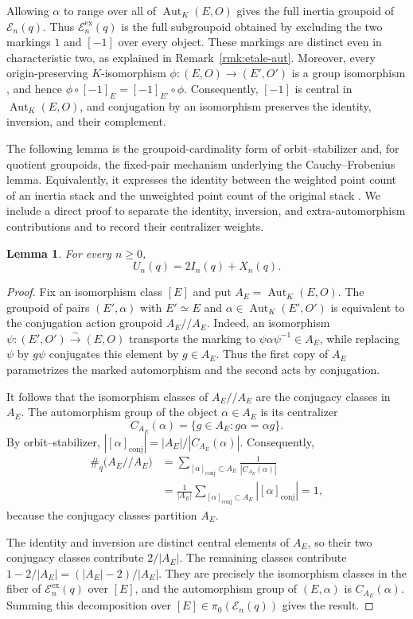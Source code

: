 \documentclass[a4paper,12pt]{amsart}
\newtheorem{lem}[thm]{Lemma}
\theoremstyle{definition}
\newcommand{\cE}{\mathcal E}
\newcommand{\Aut}{\operatorname{Aut}}
\begin{document}
Allowing $\alpha$ to range over all of $\Aut_K(E,O)$ gives the full inertia groupoid of $\cE_n(q)$.  Thus $\cE_n^{\mathrm{ex}}(q)$ is the full subgroupoid obtained by excluding the two markings $1$ and $[-1]$ over every object.  These markings are distinct even in characteristic two, as explained in Remark~\ref{rmk:etale-aut}.  Moreover, every origin-preserving $K$-isomorphism $\phi\colon(E,O)\to(E',O')$ is a group isomorphism \cite[Chapter~III, Theorem~4.8]{Silverman}, and hence $\phi\circ[-1]_E=[-1]_{E'}\circ\phi$.  Consequently, $[-1]$ is central in $\Aut_K(E,O)$, and conjugation by an isomorphism preserves the identity, inversion, and their complement.

The following lemma is the groupoid-cardinality form of orbit--stabilizer and, for quotient groupoids, the fixed-pair mechanism underlying the Cauchy--Frobenius lemma.  Equivalently, it expresses the identity between the weighted point count of an inertia stack and the unweighted point count of the original stack \cite[Theorem~1.1]{HP2}.  We include a direct proof to separate the identity, inversion, and extra-automorphism contributions and to record their centralizer weights.

\begin{lem}\label{lem:inertia}
For every $n\geq0$,
\[
U_n(q)=2I_n(q)+X_n(q).
\]
\end{lem}

\begin{proof}
Fix an isomorphism class $[E]$ and put $A_E=\Aut_K(E,O)$.  The groupoid of pairs $(E',\alpha)$ with $E'\simeq E$ and $\alpha\in\Aut_K(E',O')$ is equivalent to the conjugation action groupoid $A_E\mathbin{//}A_E$.  Indeed, an isomorphism $\psi\colon(E',O')\xrightarrow{\sim}(E,O)$ transports the marking to $\psi\alpha\psi^{-1}\in A_E$, while replacing $\psi$ by $g\psi$ conjugates this element by $g\in A_E$.  Thus the first copy of $A_E$ parametrizes the marked automorphism and the second acts by conjugation.

It follows that the isomorphism classes of $A_E\mathbin{//}A_E$ are the conjugacy classes in $A_E$.  The automorphism group of the object $\alpha\in A_E$ is its centralizer
\[
C_{A_E}(\alpha)=\{g\in A_E:g\alpha=\alpha g\}.
\]
By orbit--stabilizer,
$|[\alpha]_{\mathrm{conj}}|=|A_E|/|C_{A_E}(\alpha)|$.  Consequently,
\[
\begin{aligned}
\#_q\bigl(A_E\mathbin{//}A_E\bigr)
&=
\sum_{[\alpha]_{\mathrm{conj}}\subset A_E}
\frac{1}{|C_{A_E}(\alpha)|}\\
&=
\frac{1}{|A_E|}
\sum_{[\alpha]_{\mathrm{conj}}\subset A_E}
|[\alpha]_{\mathrm{conj}}|
=1,
\end{aligned}
\]
because the conjugacy classes partition $A_E$.

The identity and inversion are distinct central elements of $A_E$, so their two conjugacy classes contribute $2/|A_E|$.  The remaining classes contribute $1-2/|A_E|=(|A_E|-2)/|A_E|$.  They are precisely the isomorphism classes in the fiber of $\cE_n^{\mathrm{ex}}(q)$ over $[E]$, and the automorphism group of $(E,\alpha)$ is $C_{A_E}(\alpha)$.  Summing this decomposition over $[E]\in\pi_0(\cE_n(q))$ gives the result.
\end{proof}
\end{document}
